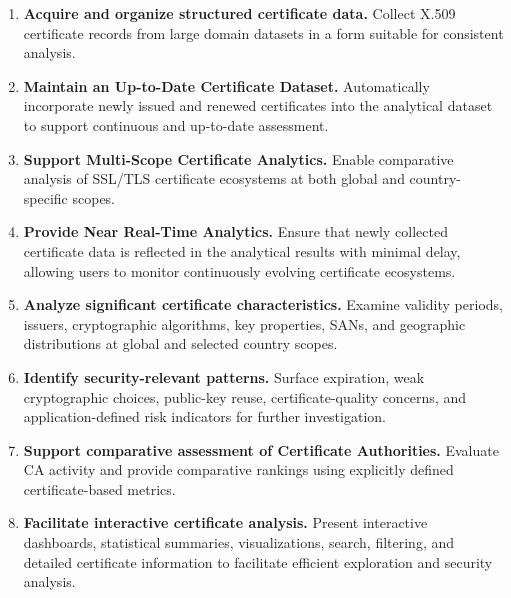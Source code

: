 \begin{enumerate}[label=\arabic*.,leftmargin=0.42in]
  \item \textbf{Acquire and organize structured certificate data.} Collect X.509 certificate records from large domain datasets in a form suitable for consistent analysis. %

  \item \textbf{Maintain an Up-to-Date Certificate Dataset.} Automatically incorporate newly issued and renewed certificates into the analytical dataset to support continuous and up-to-date assessment. %

  \item \textbf{Support Multi-Scope Certificate Analytics.} Enable comparative analysis of SSL/TLS certificate ecosystems at both global and country-specific scopes. %

  \item \textbf{Provide Near Real-Time Analytics.} Ensure that newly collected certificate data is reflected in the analytical results with minimal delay, allowing users to monitor continuously evolving certificate ecosystems. %

  \item \textbf{Analyze significant certificate characteristics.} Examine validity periods, issuers, cryptographic algorithms, key properties, SANs, and geographic distributions at global and selected country scopes. %

  \item \textbf{Identify security-relevant patterns.} Surface expiration, weak cryptographic choices, public-key reuse, certificate-quality concerns, and application-defined risk indicators for further investigation. %

  \item \textbf{Support comparative assessment of Certificate Authorities.} Evaluate CA activity and provide comparative rankings using explicitly defined certificate-based metrics. %

  \item \textbf{Facilitate interactive certificate analysis.} Present interactive dashboards, statistical summaries, visualizations, search, filtering, and detailed certificate information to facilitate efficient exploration and security analysis. %
\end{enumerate}

